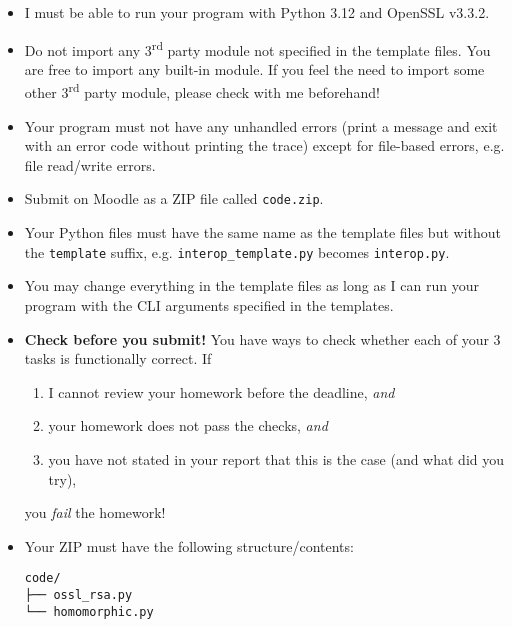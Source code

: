 \documentclass{homework}
\begin{document}
\begin{itemize}
  \item I must be able to run your program with Python 3.12 and OpenSSL v3.3.2\footnotemark{}.
  \item Do not import any 3\textsuperscript{rd} party module\footnotemark{} not specified in the template files.
  You are free to import any built-in module.
  If you feel the need to import some other 3\textsuperscript{rd} party module, please check with me beforehand!
  \item Your program must not have any unhandled errors (print a message and exit with an error code without printing the trace) except for file-based errors, e.g. file read/write errors.
  \item Submit on Moodle as a ZIP file called \texttt{code.zip}.
  \item Your Python files must have the same name as the template files but without the \texttt{template} suffix, e.g. \texttt{interop\_template.py} becomes \texttt{interop.py}.
  \item You may change everything in the template files as long as I can run your program with the CLI arguments specified in the templates.
  \item \textbf{Check before you submit!}
  You have ways to check whether each of your 3 tasks is functionally correct.
  If
  \begin{enumerate}
    \item I cannot review your homework before the deadline, \emph{and}
    \item your homework does not pass the checks, \emph{and}
    \item you have not stated in your report that this is the case (and what did you try),
  \end{enumerate}
  you \emph{fail} the homework!
  \item Your ZIP must have the following structure/contents:
  \begin{Verbatim}
code/
├── ossl_rsa.py
└── homomorphic.py
  \end{Verbatim}
\begin{Verbatim}
  
\end{Verbatim}
\end{itemize}
\end{document}
